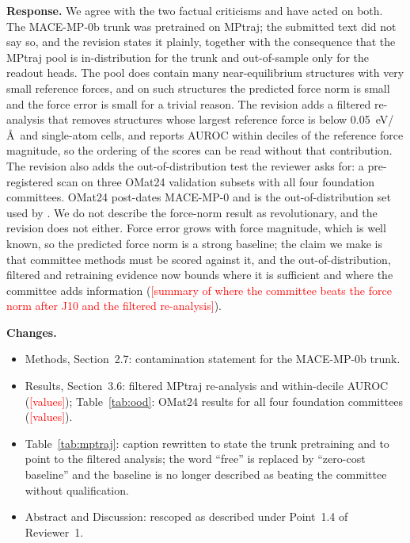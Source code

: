 \documentclass[11pt]{article}
\providecommand{\fsTODO}[1]{\textcolor{red}{[#1]}}
\newcommand{\response}{\medskip\noindent\textbf{Response.} }
\newcommand{\changes}{\medskip\noindent\textbf{Changes.}}
\begin{document}
\response
We agree with the two factual criticisms and have acted on both. The
MACE-MP-0b trunk was pretrained on MPtraj; the submitted text did not say so,
and the revision states it plainly, together with the consequence that the
MPtraj pool is in-distribution for the trunk and out-of-sample only for the
readout heads. The pool does contain many near-equilibrium structures with
very small reference forces, and on such structures the predicted force norm
is small and the force error is small for a trivial reason. The revision
adds a filtered re-analysis that removes structures whose largest reference
force is below 0.05~eV/\AA\ and single-atom cells, and reports AUROC within
deciles of the reference force magnitude, so the ordering of the scores can
be read without that contribution. The revision also adds the
out-of-distribution test the reviewer asks for: a pre-registered scan on
three OMat24 validation subsets with all four foundation committees. OMat24
post-dates MACE-MP-0 and is the out-of-distribution set used by
\citet{beck2025committee}. We do not describe the force-norm result as
revolutionary, and the revision does not either. Force error grows with
force magnitude, which is well known, so the predicted force norm is a
strong baseline; the claim we make is that committee methods must be scored
against it, and the out-of-distribution, filtered and retraining evidence now
bounds where it is sufficient and where the committee adds information
(\fsTODO{summary of where the committee beats the force norm after J10 and
the filtered re-analysis}).

\changes
\begin{itemize}
\item Methods, Section~2.7: contamination statement for the MACE-MP-0b trunk.
\item Results, Section~3.6: filtered MPtraj re-analysis and within-decile
  AUROC (\fsTODO{values}); Table~\ref{tab:ood}: OMat24 results for all four
  foundation committees (\fsTODO{values}).
\item Table~\ref{tab:mptraj}: caption rewritten to state the trunk
  pretraining and to point to the filtered analysis; the word ``free'' is
  replaced by ``zero-cost baseline'' and the baseline is no longer described
  as beating the committee without qualification.
\item Abstract and Discussion: rescoped as described under Point~1.4 of
  Reviewer~1.
\end{itemize}
\end{document}
